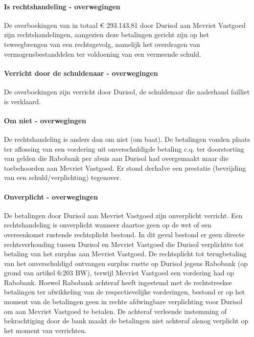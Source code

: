 \documentclass[
  dutch,
  a4paper,
]{article}
\begin{document}
\paragraph{Is rechtshandeling - overwegingen}\label{is-rechtshandeling---overwegingen-11}

De overboekingen van in totaal € 293.143,81 door Durisol aan Mevriet Vastgoed zijn rechtshandelingen, aangezien deze betalingen gericht zijn op het teweegbrengen van een rechtsgevolg, namelijk het overdragen van vermogensbestanddelen ter voldoening van een vermeende schuld.

\paragraph{Verricht door de schuldenaar - overwegingen}\label{verricht-door-de-schuldenaar---overwegingen-11}

De overboekingen zijn verricht door Durisol, de schuldenaar die naderhand failliet is verklaard.

\paragraph{Om niet - overwegingen}\label{om-niet---overwegingen-11}

De rechtshandeling is anders dan om niet (om baat). De betalingen vonden plaats ter aflossing van een vordering uit onverschuldigde betaling c.q. ter doorstorting van gelden die Rabobank per abuis aan Durisol had overgemaakt maar die toebehoorden aan Mevriet Vastgoed. Er stond derhalve een prestatie (bevrijding van een schuld/verplichting) tegenover.

\paragraph{Onverplicht - overwegingen}\label{onverplicht---overwegingen-11}

De betalingen door Durisol aan Mevriet Vastgoed zijn onverplicht verricht. Een rechtshandeling is onverplicht wanneer daartoe geen op de wet of een overeenkomst rustende rechtsplicht bestond. In dit geval bestond er geen directe rechtsverhouding tussen Durisol en Mevriet Vastgoed die Durisol verplichtte tot betaling van het surplus aan Mevriet Vastgoed. De rechtsplicht tot terugbetaling van het onverschuldigd ontvangen surplus rustte op Durisol jegens Rabobank (op grond van artikel 6:203 BW), terwijl Mevriet Vastgoed een vordering had op Rabobank. Hoewel Rabobank achteraf heeft ingestemd met de rechtstreekse betalingen ter afwikkeling van de respectievelijke vorderingen, bestond er op het moment van de betalingen geen in rechte afdwingbare verplichting voor Durisol om aan Mevriet Vastgoed te betalen. De achteraf verleende instemming of bekrachtiging door de bank maakt de betalingen niet achteraf alsnog verplicht op het moment van verrichten.
\end{document}
